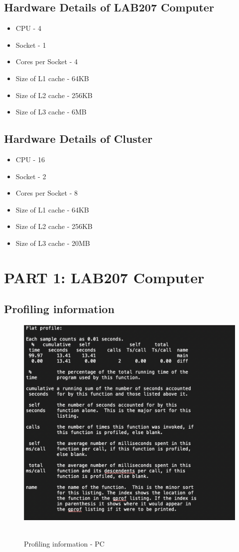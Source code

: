 \documentclass[article, 11pt]{article}
\begin{document}
\subsection{Hardware Details of LAB207 Computer}

\begin{itemize}
    \item CPU - 4
    \item Socket - 1
    \item Cores per Socket - 4
    \item Size of L1 cache - 64KB
    \item Size of L2 cache - 256KB
    \item Size of L3 cache - 6MB
\end{itemize}

\subsection{Hardware Details of Cluster}

\begin{itemize}
    \item CPU - 16
    \item Socket - 2
    \item Cores per Socket - 8
    \item Size of L1 cache - 64KB
    \item Size of L2 cache - 256KB
    \item Size of L3 cache - 20MB
\end{itemize}



\section{PART 1: LAB207 Computer}

\subsection{Profiling information}
\begin{figure}[H]
\centering
\includegraphics[width = 3 in]{1_PC.png}~
\caption{Profiling information - PC} \label{Q1_profile_PC.png}
\end{figure}
\end{document}
